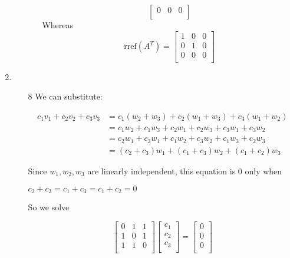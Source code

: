 \documentclass[12pt,letterpaper]{article}
\begin{document}
\begin{enumerate}[label=\S 2.\arabic*]
\begin{enumerate}
\begin{enumerate}
\[\begin{bmatrix}
                  0 & 0 & 0 \\
                \end{bmatrix}
              \]
              Whereas
              \[
                \text{rref}\left(A^T\right)
                =
                \begin{bmatrix}
                  1 & 0 & 0 \\
                  0 & 1 & 0 \\
                  0 & 0 & 0 \\
                \end{bmatrix}
              \]
          \end{enumerate}
      \end{enumerate}
    \item
      \begin{enumerate}
        \item [8]
          We can substitute:

          \begin{align*}
            c_1v_1 + c_2v_2 + c_3v_3
            &=
            c_1(w_2 + w_3) + c_2(w_1 + w_3) + c_3(w_1 + w_2)
            \\
            &=
            c_1w_2 + c_1w_3 + c_2w_1 + c_2w_3 + c_3w_1 + c_3w_2
            \\
            &=
            c_2w_1 + c_3w_1 + c_1w_2 + c_3w_2 + c_1w_3 + c_2w_3
            \\
            &=
            (c_2 + c_3)w_1 + (c_1 + c_3)w_2 + (c_1 + c_2)w_3
          \end{align*}

          Since $w_1, w_2, w_3$ are linearly independent,
          this equation is 0 only when

          $c_2 + c_3 = c_1 + c_3 = c_1 + c_2 = 0$

          So we solve

          \[
            \begin{bmatrix}
              0 & 1 & 1 \\
              1 & 0 & 1 \\
              1 & 1 & 0 \\
            \end{bmatrix}
            \begin{bmatrix}
              c_1 \\
              c_2 \\
              c_3 \\
            \end{bmatrix}
            =
            \begin{bmatrix}
              0 \\
              0 \\
              0 \\
            \end{bmatrix}
          \]


\end{enumerate}
\end{enumerate}
\end{document}
